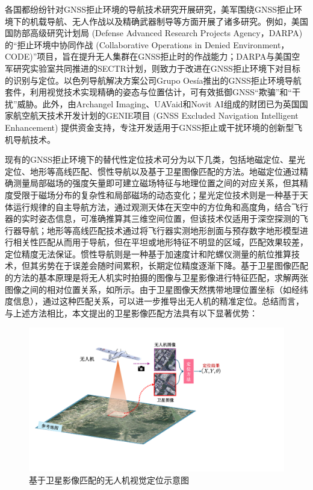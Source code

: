 \documentclass[12pt]{article}
\begin{document}
各国都纷纷针对GNSS拒止环境的导航技术研究开展研究\cite{CODE}，美军围绕GNSS拒止环境下的机载导航、无人作战以及精确武器制导等方面开展了诸多研究。例如，美国国防部高级研究计划局 (Defense Advanced Research Projects Agency，DARPA) 的“拒止环境中协同作战 (Collaborative Operations in Denied Environment，CODE)”项目，旨在提升无人集群在GNSS拒止时的作战能力；DARPA与美国空军研究实验室共同推进的SECTR计划，则致力于改进在GNSS拒止环境下对目标的识别与定位。以色列导航解决方案公司Grupo Oesía推出的GNSS拒止环境导航套件，利用视觉技术实现精确的姿态与位置估计，可有效抵御GNSS“欺骗”和“干扰”威胁。此外，由Archangel Imaging、UAVaid和Novit AI组成的财团已为英国国家航空航天技术开发计划的GENIE项目 (GNSS Excluded Navigation Intelligent Enhancement) 提供资金支持，专注开发适用于GNSS拒止或干扰环境的创新型飞机导航技术。

现有的GNSS拒止环境下的替代性定位技术可分为以下几类，包括地磁定位、星光定位、地形等高线匹配、惯性导航以及基于卫星图像匹配的方法\cite{MOTO202502004}。地磁定位通过精确测量局部磁场的强度矢量即可建立磁场特征与地理位置之间的对应关系，但其精度受限于磁场分布的复杂性和局部磁场的动态变化；星光定位技术则是一种基于天体运行规律的自主导航方法，通过观测天体在天空中的方位角和高度角，结合飞行器的实时姿态信息，可准确推算其三维空间位置，但该技术仅适用于深空探测的飞行器导航；地形等高线匹配技术通过将飞行器实测地形剖面与预存数字地形模型进行相关性匹配从而用于导航，但在平坦或地形特征不明显的区域，匹配效果较差，定位精度无法保证。惯性导航则是一种基于加速度计和陀螺仪测量的航位推算技术，但其劣势在于误差会随时间累积，长期定位精度逐渐下降。基于卫星图像匹配的方法的基本原理是将无人机实时拍摄的图像与卫星影像进行特征匹配，求解两张图像之间的相对位置关系，如所示。由于卫星图像天然携带地理位置坐标（如经纬度信息）\cite{CUXI202410035}，通过这种匹配关系，可以进一步推导出无人机的精准定位。总结而言，与上述方法相比，本文提出的卫星影像匹配方法具有以下显著优势：

\begin{figure}
	\centering
	\includegraphics[width=1.0\linewidth]{figures/基于卫星影像匹配的无人机定位示意图2.pdf}
	\caption{基于卫星影像匹配的无人机视觉定位示意图}
 \label{basicprinciples}
\end{figure}
\end{document}
